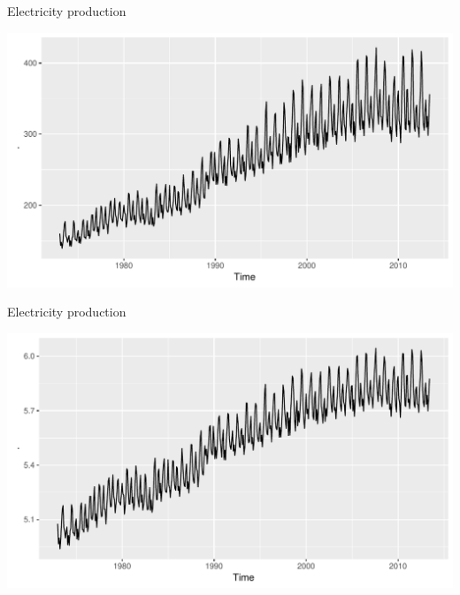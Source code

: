 \documentclass[14pt,ignorenonframetext,]{beamer}
\newenvironment{Shaded}{\begin{snugshade}}{\end{snugshade}}
\newcommand{\KeywordTok}[1]{\textcolor[rgb]{0.13,0.29,0.53}{\textbf{#1}}}
\newcommand{\StringTok}[1]{\textcolor[rgb]{0.31,0.60,0.02}{#1}}
\newcommand{\OperatorTok}[1]{\textcolor[rgb]{0.81,0.36,0.00}{\textbf{#1}}}
\newcommand{\NormalTok}[1]{#1}
\begin{document}
\begin{frame}[fragile]{Electricity production}

\begin{Shaded}
\end{Shaded}

\includegraphics{week_5_arima_files/figure-beamer/unnamed-chunk-13-1.pdf}

\end{frame}

\begin{frame}[fragile]{Electricity production}

\begin{Shaded}
\end{Shaded}

\includegraphics{week_5_arima_files/figure-beamer/unnamed-chunk-14-1.pdf}

\end{frame}
\end{document}
